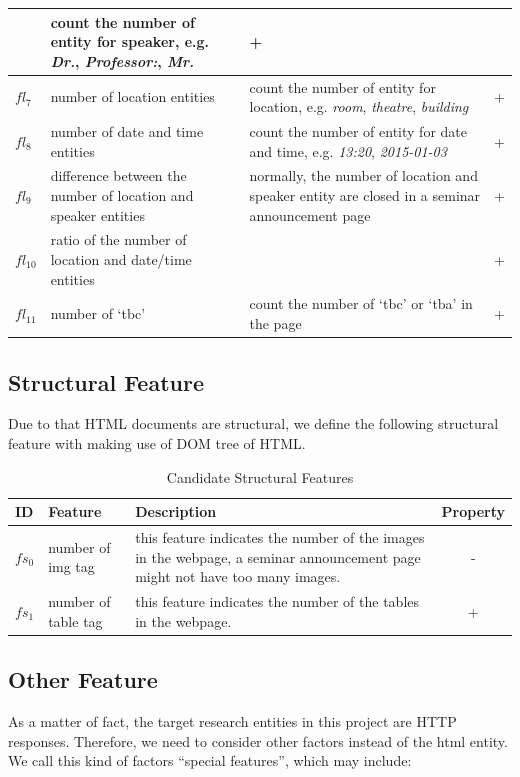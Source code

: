 \begin{table}[htb!]
{\begin{tabular}{@{}p{}p{}p{}c@{}}
	& count the number of entity for speaker, e.g. \textit{Dr.}, \textit{Professor:}, \textit{Mr.}
	& + \\ \midrule
$fl_{7}$ 
	& number of location entities 
	& count the number of entity for location, e.g. \textit{room}, \textit{theatre}, \textit{building}
	& + \\ \midrule
$fl_{8}$ 
	& number of date and time entities
	& count the number of entity for date and time, e.g. \textit{13:20}, \textit{2015-01-03}
	& + \\ \midrule
$fl_{9}$ 
	& difference between the number of location and speaker entities
	& normally, the number of location and speaker entity are closed in a seminar announcement page
	& + \\ \midrule
$fl_{10}$ 
	& ratio of the number of location and date/time entities
	& 
	& + \\ \midrule
$fl_{11}$ 
	& number of `tbc'
	& count the number of `tbc' or `tba' in the page
	& + \\ \bottomrule
\end{tabular}
}
\end{table}


\subsection{Structural Feature}
Due to that HTML documents are structural, we define the following structural feature with making use of DOM tree of HTML.

\begin{table}[htb!]
\small
\centering
\caption{Candidate Structural Features}
\label{tab:ca_feature:struct}
\begin{tabular}{@{}p{}p{}p{}c@{}}
\toprule
\textbf{ID} & \textbf{Feature} & \textbf{Description} & \textbf{Property} \\ \midrule
$fs_{0}$ 
	& number of img tag 
	& this feature indicates the number of the images in the webpage, a seminar announcement page might not have too many images.
	& - \\ \midrule
$fs_{1}$ 
	& number of table tag 
	& this feature indicates the number of the tables in the webpage.
	& + \\ \bottomrule
\end{tabular}
\end{table}


\subsection{Other Feature}
As a matter of fact, the target research entities in this project are HTTP responses. Therefore, we need to consider other factors instead of the html entity. We call this kind of factors ``special features'', which may include: 

